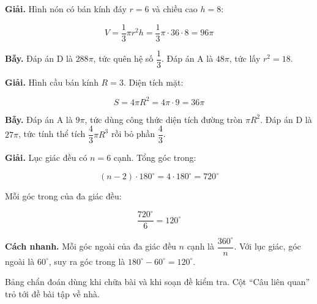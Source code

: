 \documentclass[11pt, a4paper]{article}
\begin{document}
\begin{dapan}[13 — Đáp án B]
\textbf{Giải.} Hình nón có bán kính đáy $r = 6$ và chiều cao $h = 8$:

$$V = \frac{1}{3}\pi r^2 h = \frac{1}{3}\pi \cdot 36 \cdot 8 = 96\pi$$

\textbf{Bẫy.} Đáp án D là $288\pi$, tức quên hệ số $\dfrac{1}{3}$. Đáp án A là $48\pi$, tức lấy $r^2 = 18$.
\end{dapan}

\begin{dapan}[14 — Đáp án C]
\textbf{Giải.} Hình cầu bán kính $R = 3$. Diện tích mặt:

$$S = 4\pi R^2 = 4\pi \cdot 9 = 36\pi$$

\textbf{Bẫy.} Đáp án A là $9\pi$, tức dùng công thức diện tích đường tròn $\pi R^2$. Đáp án D là $27\pi$, tức tính thể tích $\dfrac{4}{3}\pi R^3$ rồi bỏ phần $\dfrac{4}{3}$.
\end{dapan}

\begin{dapan}[15 — Đáp án D]
\textbf{Giải.} Lục giác đều có $n = 6$ cạnh. Tổng góc trong:

$$(n-2) \cdot 180^\circ = 4 \cdot 180^\circ = 720^\circ$$

Mỗi góc trong của đa giác đều:

$$\frac{720^\circ}{6} = 120^\circ$$

\textbf{Cách nhanh.} Mỗi góc ngoài của đa giác đều $n$ cạnh là $\dfrac{360^\circ}{n}$. Với lục giác, góc ngoài là $60^\circ$, suy ra góc trong là $180^\circ - 60^\circ = 120^\circ$.
\end{dapan}

\clearpage
{}

Bảng chẩn đoán dùng khi chữa bài và khi soạn đề kiểm tra. Cột ``Câu liên quan'' trỏ tới đề bài tập về nhà.
\end{document}
